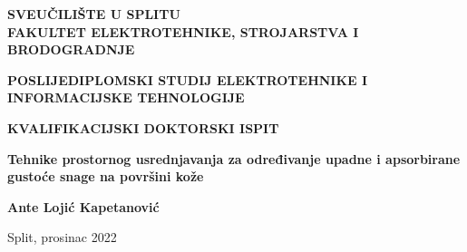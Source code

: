 \protect\thispagestyle{empty}
\begin{titlepage}
\begin{center}

\normalsize
\textbf{SVEUČILIŠTE U SPLITU\\
FAKULTET ELEKTROTEHNIKE, STROJARSTVA I BRODOGRADNJE}

\vspace{1cm}

\textbf{POSLIJEDIPLOMSKI STUDIJ ELEKTROTEHNIKE I INFORMACIJSKE TEHNOLOGIJE}

\vfill

\textbf{KVALIFIKACIJSKI DOKTORSKI ISPIT}

\vspace{2cm}

\Large
\textbf{Tehnike prostornog usrednjavanja za određivanje upadne i apsorbirane gustoće snage na površini kože}


\vspace{2cm}

\normalsize 
\textbf{Ante Lojić Kapetanović}

\vfill

\normalsize
Split, prosinac 2022

\end{center}
\end{titlepage}